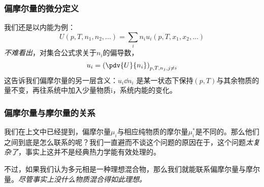 \subsubsection{偏摩尔量的微分定义}
我们还是以内能为例：
$$ U (p, T, n_1, n_2, ...) = \sum_i n_i u_i(p, T, x_1, x_2, ...) $$
\textsl{不难看出}，对集合公式求关于$n_i$的偏导数，
$$
{u_i} = \left(\pdv{U}{n_i}\right)_{p,T,n_j, j \neq i} 
$$
这告诉我们偏摩尔量的另一层含义：$u_i \dd n_i$ 是某一状态下保持$(p,T)$与其余物质的量不变，再往系统中加入少量物质i，系统内能的变化。

\subsubsection{偏摩尔量与摩尔量的关系}
我们在上文中已经提到，偏摩尔量$\mu_i$与相应纯物质的摩尔量$\mu_i^*$是不同的。那么他们之间到底是怎么联系的呢？我们一直避而不谈这个问题的原因在于，这个问题\textsl{太复杂了}，事实上这并不是经典热力学能有效处理的。

不过，如果我们认为多元相是一种理想混合物，那么我们就能联系偏摩尔量与摩尔量。\textsl{尽管事实上没什么物质混合得如此理想。}



